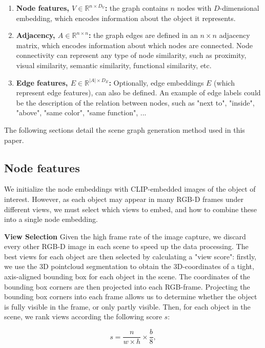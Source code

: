 \begin{enumerate}
    \item \textbf{Node features, $V \in \mathbb{R}^{n \times D_V}$: } the graph contains $n$ nodes with $D$-dimensional embedding, which encodes information about the object it represents.
    \item \textbf{Adjacency, $A \in \mathbb{R}^{n \times n}$:} the graph edges are defined in an $n \times n$ adjacency matrix, which encodes information about which nodes are connected. Node connectivity can represent any type of node similarity, such as proximity, visual similarity, semantic similarity, functional similarity, etc.
    \item \textbf{Edge features, $E \in \mathbb{R}^{|A| \times D_E} $: } Optionally, edge embeddings $E$ (which represent edge features), can also be defined. An example of edge labels could be the description of the relation between nodes, such as "next to", "inside", "above", "same color", "same function", ...
\end{enumerate}

The following sections detail the scene graph generation method used in this paper.

\subsection{Node features}
We initialize the node embeddings with CLIP-embedded images of the object of interest. However, as each object may appear in many RGB-D frames under different views, we must select which views to embed, and how to combine these into a single node embedding.

\bigskip
\noindent
\textbf{View Selection}
Given the high frame rate of the image capture, we discard every other RGB-D image in each scene to speed up the data processing. The best views for each object are then selected by calculating a "view score": firstly, we use the 3D pointcloud segmentation to obtain the 3D-coordinates of a tight, axis-aligned bounding box for each object in the scene. The coordinates of the bounding box corners are then projected into each RGB-frame. Projecting the bounding box corners into each frame allows us to determine whether the object is fully visible in the frame, or only partly visible. Then, for each object in the scene, we rank views according the following score $s$:

\begin{equation*}
    s = \frac{n}{w \times h} \times \frac{b}{8},
\end{equation*}

